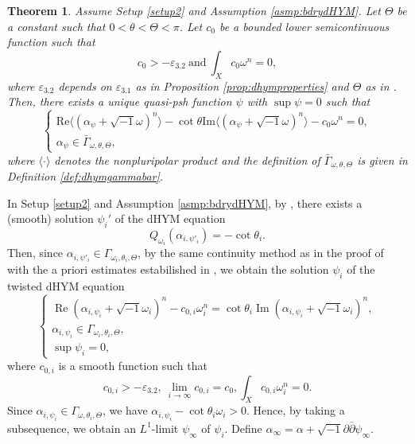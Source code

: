 \documentclass{amsart}
\numberwithin{equation}{section}
\theoremstyle{plain}
\newtheorem{thm}[equation]{Theorem}
\theoremstyle{definition}
\theoremstyle{remark}
\newcommand{\delb}{\sqrt{-1}\partial\bar{\partial}}
\begin{document}
\begin{thm}\label{thm:tdHYM}
    Assume Setup \ref{setup2} and Assumption \ref{asmp:bdrydHYM}. Let $\Theta$ be a constant such that $0<\theta<\Theta<\pi$. Let $c_0$ be a bounded lower semicontinuous function such that 
    \begin{equation}
        c_0>-\varepsilon_{3.2} \ \text{and} \  \int_X c_0\omega^n=0,
    \end{equation} 
    where $\varepsilon_{3.2}$ depends on $\varepsilon_{3.1}$ as in Proposition \ref{prop:dhymproperties} and $\Theta$ as in \cite[Lemma 5.6 (5)]{GChen}. Then, there exists a unique quasi-psh function $\psi$ with $\sup\psi=0$ such that
    \begin{equation}\label{eq:tdHYM}
        \begin{cases}
            \mathrm{Re}\langle(\alpha_\psi+\sqrt{-1}\omega)^n\rangle-\cot\theta\mathrm{Im}\langle(\alpha_\psi+\sqrt{-1}\omega)^n\rangle-c_0\omega^n=0,\\
            \alpha_\psi\in\bar{\Gamma}_{\omega,\theta,\Theta},
        \end{cases}
    \end{equation}
    where $\langle\cdot\rangle$ denotes the nonpluripolar product and the definition of $\bar{\Gamma}_{\omega,\theta,\Theta}$ is given in Definition \ref{def:dhymgammabar}.
\end{thm}

In Setup \ref{setup2} and Assumption \ref{asmp:bdrydHYM}, by \cite[Theorem 1.3]{CLT}, there exists a (smooth) solution $\psi_i'$ of the dHYM equation 
\begin{equation*}
    Q_{\omega_i}(\alpha_{i,\psi'_i})=-\cot\theta_i.
\end{equation*}
Then, since $\alpha_{i,\psi'_i}\in{\Gamma}_{\omega_i,\theta_i,\Theta}$, by the same continuity method as in the proof of \cite[Proposition 5.5]{GChen} with the a priori estimates estabilished in \cite[Theorem 1.2]{Linb}, 
we obtain the solution $\psi_i$ of the twisted dHYM equation
\begin{equation}\label{eq:appdhym}
    \begin{cases}
        \operatorname{Re}(\alpha_{i,\psi_i}+\sqrt{-1}\omega_i)^n-c_{0,i}\omega_i^n=\cot\theta_i\operatorname{Im}(\alpha_{i,\psi_i}+\sqrt{-1}\omega_i)^n,\\
        \alpha_{i,\psi_i}\in{\Gamma}_{\omega_i,\theta_i,\Theta},\\
        \sup \psi_i=0,
    \end{cases}
    \end{equation}
    where $c_{0,i}$ is a smooth function  such that
    \begin{equation*}
        c_{0,i}>-\varepsilon_{3.2}, \  \lim_{i\to\infty} c_{0,i}=c_0,\int_X c_{0,i}\omega_i^n=0.
    \end{equation*}
Since $\alpha_{i,\psi_i}\in{\Gamma}_{\omega,\theta_i,\Theta}$, we have $\alpha_{i,\psi_i}-\cot\theta_i\omega_i>0$. Hence, by taking a subsequence, we obtain an $L^1$-limit $\psi_\infty$ of $\psi_i$. Define $\alpha_\infty=\alpha+\delb \psi_\infty$.
\end{document}
